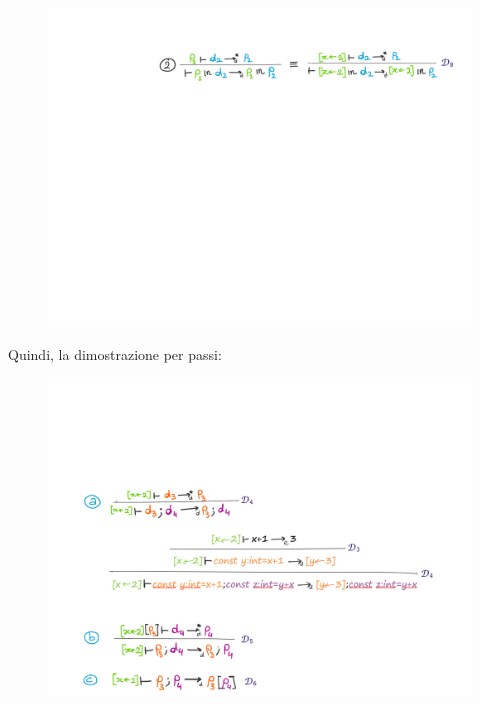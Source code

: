 \documentclass[a4paper]{article}
\begin{document}
	\begin{figure}[!htp]
		\centering
		\includegraphics[width=\textwidth]{img/regola_espressione-ex4.pdf}
	\end{figure}
	
	\noindent
	Quindi, la dimostrazione per passi:
	
	\begin{figure}[!htp]
		\centering
		\includegraphics[width=\textwidth]{img/regola_espressione-ex5.pdf}
	\end{figure}\newpage
\end{document}
